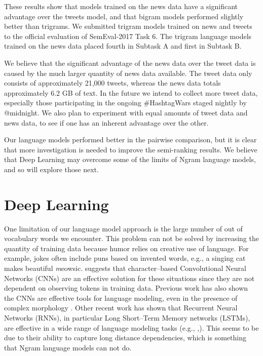 \documentclass[11pt,a4paper]{article}
\begin{document}
These results show that models trained on the news data
have a significant advantage over the tweets model, and that bigram
models performed slightly better than trigrams. We submitted
trigram models trained on news and tweets to the official evaluation 
of SemEval-2017 Task 6. The trigram language models trained on
the news data placed fourth in Subtask A and first in Subtask B.

We believe that the significant advantage of the news data over 
the tweet data is caused by the much larger quantity of news data
available. The tweet data only consists of approximately 21,000 tweets,
whereas the news data totals approximately 6.2 GB of text.
In the future we intend to collect more tweet data, especially those 
participating in the ongoing \#HashtagWars staged nightly by @midnight. 
We also plan to experiment with equal amounts of tweet data and
news data, to see if one has an inherent advantage over the other.

Our language models performed better in the pairwise comparison, 
but it is clear that more investigation is needed to improve
the semi-ranking results. 
We believe that Deep Learning
may overcome some of the limits of Ngram language models, and so
will explore those next. 

\section{Deep Learning}

One limitation of our language model approach  
is the large number of out of vocabulary 
words we  encounter. This problem can not be solved
by increasing the quantity of training data because
humor relies on creative use of language. 
For example, jokes often include puns based on 
invented words, e.g., a singing cat makes beautiful {\textit meowsic}.  
\cite{PotashRR16} suggests that character--based 
Convolutional Neural Networks (CNNs) are
an effective solution for these situations since they are not
dependent on observing tokens in training data.
Previous work
has also shown the CNNs are effective tools for
language modeling, even in the presence of complex morphology 
\cite{KimJSR15}. Other recent work has shown that Recurrent
Neural Networks (RNNs), in particular Long Short--Term Memory
networks (LSTMs), are effective in a wide range of language
modeling tasks (e.g., \cite{SundermeyerSN12},\cite{SundermeyeNS15}). 
This seems to be due to their ability to capture
long distance dependencies, which is something that Ngram language
models can not do. 
\end{document}
